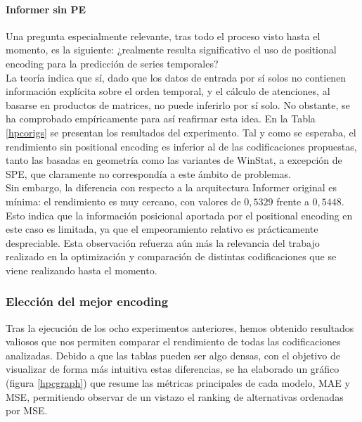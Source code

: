 \paragraph{Informer sin PE}

Una pregunta especialmente relevante, tras todo el proceso visto hasta el momento, es la siguiente: ¿realmente resulta significativo el uso de positional encoding para la predicción de series temporales?\\

La teoría indica que sí, dado que los datos de entrada por sí solos no contienen información explícita sobre el orden temporal, y el cálculo de atenciones, al basarse en productos de matrices, no puede inferirlo por sí solo.  No obstante, se ha comprobado empíricamente para así reafirmar esta idea. En la Tabla \ref{hpcorigs} se presentan los resultados del experimento. Tal y como se esperaba, el rendimiento sin positional encoding es inferior al de las codificaciones propuestas, tanto las basadas en geometría como las variantes de WinStat, a excepción de SPE, que claramente no correspondía a este ámbito de problemas.\\

Sin embargo, la diferencia con respecto a la arquitectura Informer original es mínima: el rendimiento es muy cercano, con valores de $0,5329$ frente a $0,5448$. Esto indica que la información posicional aportada por el positional encoding en este caso es limitada, ya que el empeoramiento relativo es prácticamente despreciable. Esta observación refuerza aún más la relevancia del trabajo realizado en la optimización y comparación de distintas codificaciones que se viene realizando hasta el momento.

\subsubsection{Elección del mejor encoding}

Tras la ejecución de los ocho experimentos anteriores, hemos obtenido resultados valiosos que nos permiten comparar el rendimiento de todas las codificaciones analizadas. Debido a que las tablas pueden ser algo densas, con el objetivo de visualizar de forma más intuitiva estas diferencias, se ha elaborado un gráfico (figura \ref{hpcgraph}) que resume las métricas principales de cada modelo, MAE y MSE, permitiendo observar de un vistazo el ranking de alternativas ordenadas por MSE.\\

